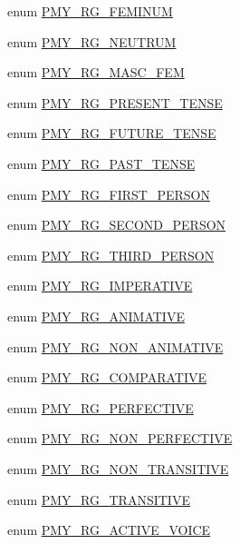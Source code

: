 \begin{DoxyCompactItemize}
\item 
enum \hyperlink{gramtab__consts_8php_a8ac726b129ab1a2d96a474017eaf68d9}{PMY\_\-RG\_\-FEMINUM} 
\item 
enum \hyperlink{gramtab__consts_8php_a9ab5be76d760abba1ad2ff855f5ab545}{PMY\_\-RG\_\-NEUTRUM} 
\item 
enum \hyperlink{gramtab__consts_8php_ae1fb65f598febb1bea94a216d9d4a56b}{PMY\_\-RG\_\-MASC\_\-FEM} 
\item 
enum \hyperlink{gramtab__consts_8php_ad17c1408f6b14a4f3419f5aa6e2875d5}{PMY\_\-RG\_\-PRESENT\_\-TENSE} 
\item 
enum \hyperlink{gramtab__consts_8php_a045a6c4b882d321998d275e16f3512d3}{PMY\_\-RG\_\-FUTURE\_\-TENSE} 
\item 
enum \hyperlink{gramtab__consts_8php_a51328b80f779be4e417f3ae34fe8d52f}{PMY\_\-RG\_\-PAST\_\-TENSE} 
\item 
enum \hyperlink{gramtab__consts_8php_a872d3d25114c84e9228dd2c3d31cd34c}{PMY\_\-RG\_\-FIRST\_\-PERSON} 
\item 
enum \hyperlink{gramtab__consts_8php_a8e719c3dcd42a0f28715caa18084a0c2}{PMY\_\-RG\_\-SECOND\_\-PERSON} 
\item 
enum \hyperlink{gramtab__consts_8php_a84c42d8c16c74f53ebf6e46b78b65ce4}{PMY\_\-RG\_\-THIRD\_\-PERSON} 
\item 
enum \hyperlink{gramtab__consts_8php_a0d961e368efa34a7e0861585c4872566}{PMY\_\-RG\_\-IMPERATIVE} 
\item 
enum \hyperlink{gramtab__consts_8php_acc9d0154f871ae9aadbb882dccd97c47}{PMY\_\-RG\_\-ANIMATIVE} 
\item 
enum \hyperlink{gramtab__consts_8php_abae29a4abcbbddafb2b590343d3c27fa}{PMY\_\-RG\_\-NON\_\-ANIMATIVE} 
\item 
enum \hyperlink{gramtab__consts_8php_a7980fdfd16892dc6663f08643e263f43}{PMY\_\-RG\_\-COMPARATIVE} 
\item 
enum \hyperlink{gramtab__consts_8php_ab110b3326b4930d01f55352895e5a44e}{PMY\_\-RG\_\-PERFECTIVE} 
\item 
enum \hyperlink{gramtab__consts_8php_a9bcf99d8a3f3c6bcf37e7145832a5d8b}{PMY\_\-RG\_\-NON\_\-PERFECTIVE} 
\item 
enum \hyperlink{gramtab__consts_8php_aef3ee4f32b389b0f30072ec3665fabdc}{PMY\_\-RG\_\-NON\_\-TRANSITIVE} 
\item 
enum \hyperlink{gramtab__consts_8php_a3b493a600213a733bdf7893b8eeda3ea}{PMY\_\-RG\_\-TRANSITIVE} 
\item 
enum \hyperlink{gramtab__consts_8php_a2600ba3b3a729f9297df88f9f25aa5c8}{PMY\_\-RG\_\-ACTIVE\_\-VOICE} 

\end{DoxyCompactItemize}
